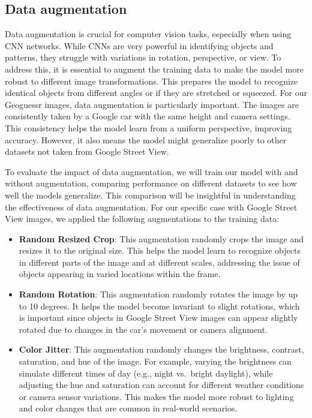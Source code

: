 \documentclass{article}
\providecommand{\tightlist}{%
  \setlength{\itemsep}{0pt}\setlength{\parskip}{0pt}}
\begin{document}
\subsection{Data augmentation}\label{data-augmentation}

Data augmentation is crucial for computer vision tasks, especially when
using CNN networks. While CNNs are very powerful in identifying objects
and patterns, they struggle with variations in rotation, perspective, or
view. To address this, it is essential to augment the training data to
make the model more robust to different image transformations. This
prepares the model to recognize identical objects from different angles
or if they are stretched or squeezed. For our Geoguessr images, data
augmentation is particularly important. The images are consistently
taken by a Google car with the same height and camera settings. This
consistency helps the model learn from a uniform perspective, improving
accuracy. However, it also means the model might generalize poorly to
other datasets not taken from Google Street View.

To evaluate the impact of data augmentation, we will train our model
with and without augmentation, comparing performance on different
datasets to see how well the models generalize. This comparison will be
insightful in understanding the effectiveness of data augmentation. For
our specific case with Google Street View images, we applied the
following augmentations to the training data:

\begin{itemize}
\tightlist
\item
  \textbf{Random Resized Crop}: This augmentation randomly crops the
  image and resizes it to the original size. This helps the model learn
  to recognize objects in different parts of the image and at different
  scales, addressing the issue of objects appearing in varied locations
  within the frame.
\item
  \textbf{Random Rotation}: This augmentation randomly rotates the image
  by up to 10 degrees. It helps the model become invariant to slight
  rotations, which is important since objects in Google Street View
  images can appear slightly rotated due to changes in the car's
  movement or camera alignment.
\item
  \textbf{Color Jitter}: This augmentation randomly changes the
  brightness, contrast, saturation, and hue of the image. For example,
  varying the brightness can simulate different times of day (e.g.,
  night vs.~bright daylight), while adjusting the hue and saturation can
  account for different weather conditions or camera sensor variations.
  This makes the model more robust to lighting and color changes that
  are common in real-world scenarios.
\end{itemize}
\end{document}
